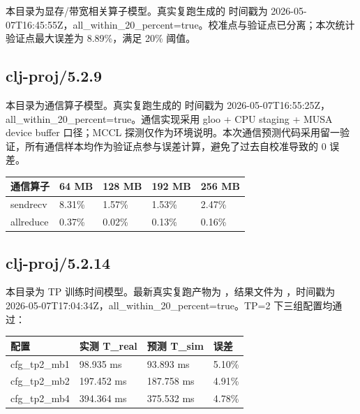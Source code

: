 \documentclass[UTF8,a4paper,11pt]{ctexart}
\begin{document}
本目录为显存/带宽相关算子模型。真实复跑生成的  时间戳为 2026-05-07T16:45:55Z，all\_within\_20\_percent=true。校准点与验证点已分离；本次统计验证点最大误差为 8.89\%，满足 20\% 阈值。

\subsection{clj-proj/5.2.9}

本目录为通信算子模型。真实复跑生成的  时间戳为 2026-05-07T16:55:25Z，all\_within\_20\_percent=true。通信实现采用 gloo + CPU staging + MUSA device buffer 口径；MCCL 探测仅作为环境说明。本次通信预测代码采用留一验证，所有通信样本均作为验证点参与误差计算，避免了过去自校准导致的 0 误差。

\begin{center}
\begin{tabular}{L{3.6cm} L{2.6cm} L{2.6cm} L{2.6cm} L{2.6cm}}
\toprule
通信算子 & 64 MB & 128 MB & 192 MB & 256 MB \\
\midrule
sendrecv & 8.31\% & 1.57\% & 1.53\% & 2.47\% \\
allreduce & 0.37\% & 0.02\% & 0.13\% & 0.16\% \\
\bottomrule
\end{tabular}
\end{center}

\subsection{clj-proj/5.2.14}

本目录为 TP 训练时间模型。最新真实复跑产物为 ，结果文件为 ，时间戳为 2026-05-07T17:04:34Z，all\_within\_20\_percent=true。TP=2 下三组配置均通过：

\begin{center}
\begin{tabular}{L{3.0cm} L{3.0cm} L{3.0cm} L{2.5cm}}
\toprule
配置 & 实测 T\_real & 预测 T\_sim & 误差 \\
\midrule
cfg\_tp2\_mb1 & 98.935 ms & 93.893 ms & 5.10\% \\
cfg\_tp2\_mb2 & 197.452 ms & 187.758 ms & 4.91\% \\
cfg\_tp2\_mb4 & 394.364 ms & 375.532 ms & 4.78\% \\
\bottomrule
\end{tabular}
\end{center}
\end{document}
